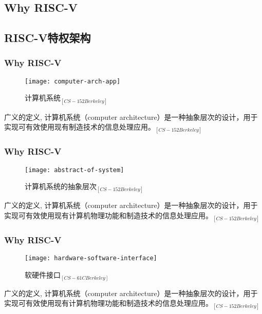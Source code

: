 \subsection{Why RISC-V} %
\subsection{RISC-V特权架构}

\begin{frame}
	
	\frametitle{Why RISC-V}
	
	\begin{figure}
		\centering
		\texttt{[image: computer-arch-app]}
		\caption{计算机系统$_{[CS-152 Berkeley]}$}
	\end{figure}
	
	广义的定义, 计算机系统（computer architecture）是一种抽象层次的设计，用于实现可有效使用现有制造技术的信息处理应用。$_{[CS-152 Berkeley]}$
\end{frame}


\begin{frame}
	
	\frametitle{Why RISC-V}
	
	\begin{figure}
		\centering
		\texttt{[image: abstract-of-system]}
		\caption{计算机系统的抽象层次$ _{[CS-152 Berkeley]} $}
	\end{figure}
	
	广义的定义, 计算机系统（computer architecture）是一种抽象层次的设计，用于实现可有效使用现有计算机物理功能和制造技术的信息处理应用。$_{[CS-152 Berkeley]}$
	
\end{frame}



\begin{frame}[plain]
	
	\frametitle{Why RISC-V}
	\begin{figure}
		\centering
		\texttt{[image: hardware-software-interface]}
		\caption{软硬件接口$ _{[CS-61C Berkeley]} $}
	\end{figure}
	
	广义的定义, 计算机系统（computer architecture）是一种抽象层次的设计，用于实现可有效使用现有计算机物理功能和制造技术的信息处理应用。$_{[CS-152 Berkeley]}$
	
\end{frame}

